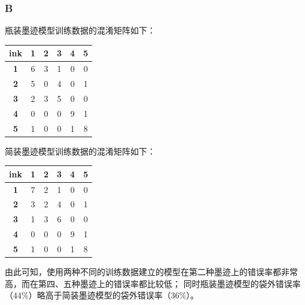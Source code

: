 \documentclass[12pt,a4paper]{article}
\begin{document}
    \subsubsection*{B}
    瓶装墨迹模型训练数据的混淆矩阵如下：
    \begin{longtable}{c|ccccc}
        \hline
        \textbf{ink} & \textbf{1} & \textbf{2} & \textbf{3} & \textbf{4} & \textbf{5}\\
        \hline
        \textbf{1} & 6 & 3 & 1 & 0 & 0\\
        \textbf{2} & 5 & 0 & 4 & 0 & 1\\
        \textbf{3} & 2 & 3 & 5 & 0 & 0\\
        \textbf{4} & 0 & 0 & 0 & 9 & 1\\
        \textbf{5} & 1 & 0 & 0 & 1 & 8\\
        \hline
    \end{longtable}
    简装墨迹模型训练数据的混淆矩阵如下：
    \begin{longtable}{c|ccccc}
        \hline
        \textbf{ink} & \textbf{1} & \textbf{2} & \textbf{3} & \textbf{4} & \textbf{5}\\
        \hline
        \textbf{1} & 7 & 2 & 1 & 0 & 0\\
        \textbf{2} & 3 & 2 & 4 & 0 & 1\\
        \textbf{3} & 1 & 3 & 6 & 0 & 0\\
        \textbf{4} & 0 & 0 & 0 & 9 & 1\\
        \textbf{5} & 1 & 0 & 0 & 1 & 8\\
        \hline
    \end{longtable}
    由此可知，使用两种不同的训练数据建立的模型在第二种墨迹上的错误率都非常高，而在第四、五种墨迹上的错误率都比较低；
    同时瓶装墨迹模型的袋外错误率（44\%）略高于简装墨迹模型的袋外错误率（36\%）。
\end{document}
